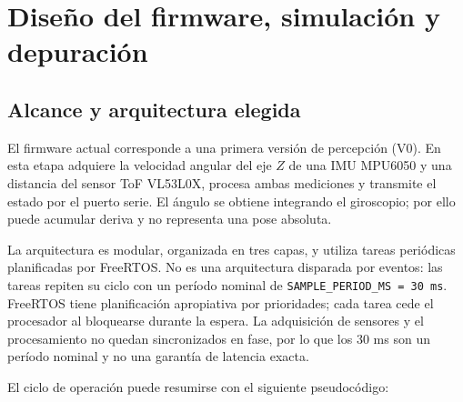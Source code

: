 
\section{Diseño del firmware, simulación y depuración}
\label{sec:diseno-firmware}

\subsection{Alcance y arquitectura elegida}

El firmware actual corresponde a una primera versión de percepción (V0). En
esta etapa adquiere la velocidad angular del eje $Z$ de una IMU MPU6050 y una
distancia del sensor ToF VL53L0X, procesa ambas mediciones y transmite el estado
por el puerto serie. El ángulo se obtiene integrando el giroscopio; por ello
puede acumular deriva y no representa una pose absoluta.

La arquitectura es modular, organizada en tres capas, y utiliza tareas
periódicas planificadas por FreeRTOS. No es una arquitectura disparada por
eventos: las tareas repiten su ciclo con un período nominal de
\texttt{SAMPLE\_PERIOD\_MS = 30 ms}. FreeRTOS tiene planificación apropiativa por
prioridades; cada tarea cede el procesador al bloquearse durante la espera. La
adquisición de sensores y el procesamiento no quedan sincronizados en fase, por
lo que los 30 ms son un período nominal y no una garantía de latencia exacta.

\begin{center}
\end{center}

El ciclo de operación puede resumirse con el siguiente pseudocódigo:

